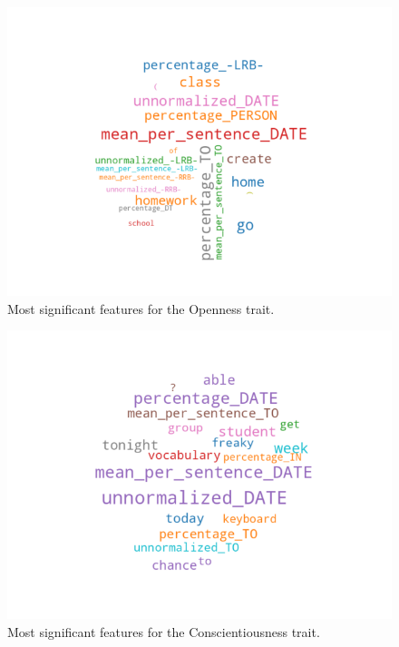 \documentclass[10pt, a4paper]{article}
\begin{document}
\begin{figure}
\begin{center}
  \includegraphics[width=\columnwidth]{figures/cOPN.png}
  \caption{Most significant features for the Openness trait.}
  \label{fig:figure3}
\end{center}
\end{figure}

\begin{figure}
\begin{center}
  \includegraphics[width=\columnwidth]{figures/cCON.png}
  \caption{Most significant features for the Conscientiousness trait.}
  \label{fig:figure4}
\end{center}
\end{figure}
\end{document}
